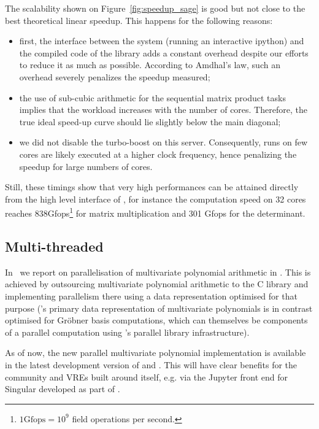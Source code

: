 \documentclass{deliverablereport}
\begin{document}
The scalability shown on Figure~\ref{fig:speedup_sage} is good but not close to the best theoretical linear
speedup. This happens for the following reasons:
\begin{itemize}
\item first, the interface between the system \SageMath (running an interactive ipython) and the compiled code of the
  library adds a constant overhead despite our efforts to reduce it as much as possible. According to Amdhal's law,
  such an overhead severely penalizes the speedup measured;
\item the use of sub-cubic arithmetic for the sequential matrix product tasks implies that the workload increases with
  the number of cores. Therefore, the true ideal speed-up curve should lie slightly below the main diagonal;
\item we did not disable the turbo-boost on this server. Consequently, runs on few cores are likely executed at a higher
  clock frequency, hence penalizing the speedup for large numbers of cores.
\end{itemize}

Still, these timings show that very high performances can be attained directly from the high level interface of
\SageMath, for instance the computation speed on 32 cores reaches 838Gfops\footnote{$1\text{Gfops} = 10^9$ field
  operations per second.} for matrix multiplication and 301 Gfops for
the determinant.

\subsection{Multi-threaded \Singular}

In~ we report on parallelisation of
multivariate polynomial arithmetic in \Singular. This is achieved by
outsourcing multivariate polynomial arithmetic to the C \FLINT library
and implementing parallelism there using a data representation
optimised for that purpose (\Singular's primary data representation of
multivariate polynomials is in contrast optimised for Gr\"{o}bner basis
computations, which can themselves be components of a parallel computation
using \Singular's parallel library infrastructure).

As of now, the new parallel multivariate polynomial implementation is available in the
latest development version of \FLINT and \Singular. This will have clear benefits for the
\Singular community and VREs built around \Singular itself, e.g. via the Jupyter front end
for Singular developed as part of .
\end{document}
